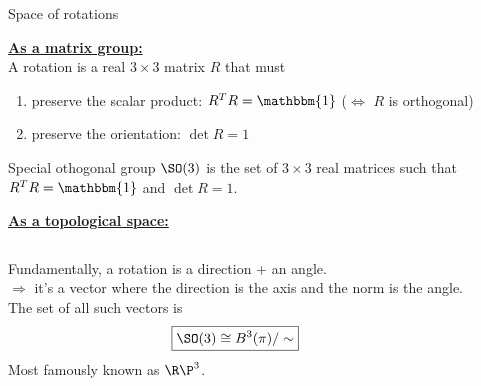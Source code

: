 \documentclass[9pt]{beamer}
\renewcommand{\emph}{\alert}
\begin{document}
\begin{frame}{Space of rotations}
      
    \textbf{\underline{As a matrix group:}}\\[0.2cm]

    A rotation is a real $3\times3$ matrix $R$ that must
    \begin{enumerate}
        \item preserve the \emph{scalar product}: $R^TR=\mathbbm{1}$ ($\Leftrightarrow$ $R$ is orthogonal)
        \item preserve the \emph{orientation}: $\det R=1$
    \end{enumerate}

    \begin{block}{Special othogonal group}
        $\SO(3)$ is the set of $3\times 3$ real matrices such that $R^TR=\mathbbm{1}$ and $\det R=1$.
    \end{block}
    

    \textbf{\underline{As a topological space:}}\\[0.2cm]

    

    \begin{columns}[T,onlytextwidth]

            Fundamentally, a rotation is a \emph{direction} + an \emph{angle}.\\
            $\Rightarrow$ it's a vector where the direction is the axis and the norm is the angle.\\[0.2cm]
            The set of all such vectors is
            \begin{equation*}
                \boxed{\SO(3)\cong B^3(\pi)/\sim}
            \end{equation*}
            Most famously known as $\R\P^3$.
  
  

\end{columns}
\end{frame}
\end{document}
